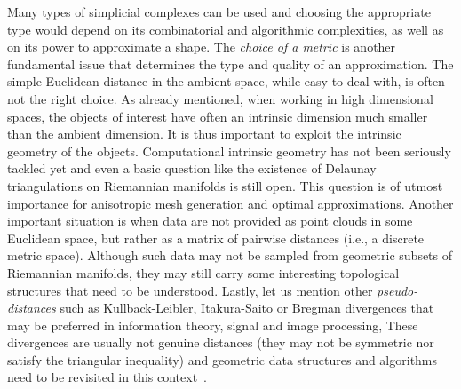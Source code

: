  Many types of simplicial complexes can be used and choosing the appropriate type would depend on its combinatorial and algorithmic complexities, as well as on its power to approximate a shape.
 The {\em choice of a metric} is another  fundamental issue 
that determines the type and quality of an approximation.
 The simple Euclidean distance in the ambient space, while easy to deal with, is often not the right choice.  As already mentioned, when working in high dimensional spaces, the objects of interest have often an intrinsic dimension much smaller than the ambient dimension. It is thus important to exploit the intrinsic geometry of the objects. Computational intrinsic geometry has not been seriously tackled yet and even a basic question like the existence of  Delaunay triangulations on Riemannian manifolds is still open.  This question is of utmost importance for anisotropic mesh generation and optimal approximations. Another important situation is when data are not provided as  point clouds in some Euclidean space, but rather as a matrix of pairwise distances (i.e., a discrete metric space). Although such data may not be sampled from geometric subsets of Riemannian manifolds, they may still carry some interesting topological structures that need to be understood. 
Lastly, let us mention other {\em pseudo-distances} such as Kullback-Leibler, Itakura-Saito or Bregman divergences that may be preferred in information theory, signal and image processing,
 These divergences are usually not genuine distances (they may not be symmetric nor satisfy the triangular inequality) and  geometric data structures and algorithms need to be revisited in this context~\cite{geometrica-6154a}.




